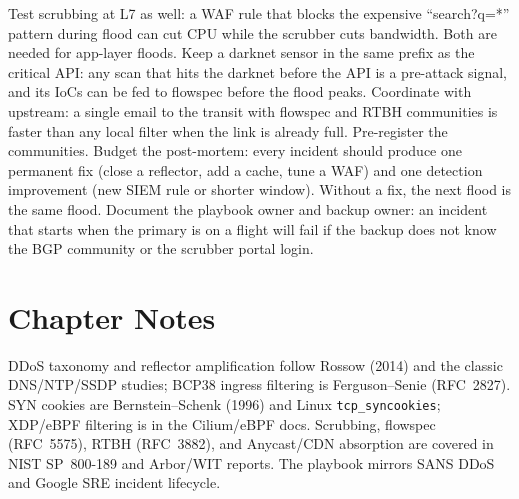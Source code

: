Test scrubbing at L7 as well: a WAF rule that blocks the expensive ``search?q=*'' pattern during flood can cut CPU while the scrubber cuts bandwidth. Both are needed for app-layer floods.
Keep a darknet sensor in the same prefix as the critical API: any scan that hits the darknet before the API is a pre-attack signal, and its IoCs can be fed to flowspec before the flood peaks.
Coordinate with upstream: a single email to the transit with flowspec and RTBH communities is faster than any local filter when the link is already full. Pre-register the communities.
Budget the post-mortem: every incident should produce one permanent fix (close a reflector, add a cache, tune a WAF) and one detection improvement (new SIEM rule or shorter window). Without a fix, the next flood is the same flood.
Document the playbook owner and backup owner: an incident that starts when the primary is on a flight will fail if the backup does not know the BGP community or the scrubber portal login.
\section*{Chapter Notes}
DDoS taxonomy and reflector amplification follow Rossow (2014) and the classic DNS/NTP/SSDP studies; BCP38 ingress filtering is Ferguson--Senie (RFC~2827). SYN cookies are Bernstein--Schenk (1996) and Linux \texttt{tcp\_syncookies}; XDP/eBPF filtering is in the Cilium/eBPF docs. Scrubbing, flowspec (RFC~5575), RTBH (RFC~3882), and Anycast/CDN absorption are covered in NIST SP~800-189 and Arbor/WIT reports. The playbook mirrors SANS DDoS and Google SRE incident lifecycle.


